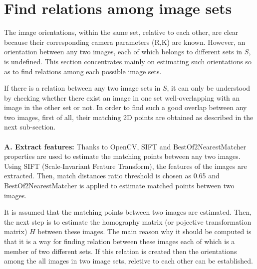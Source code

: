 \documentclass{article}
\begin{document}
\section*{Find relations among image sets}
The image orientations, within the same set, relative to each other, are clear because their corresponding camera parameters (R,K) are known. However, an orientation between any two images, each of which belongs to different sets in $S$, is undefined. This section concentrates mainly on estimating such orientations so as to find relations among each possible image sets.

If there is a relation between any two image sets in $S$, it can only be understood by checking whether there exist an image in one set well-overlapping with an image in the other set or not.  In order to find such a good overlap between any two images, first of all, their matching 2D points are obtained as described in the next sub-section.\\~\\
\textbf{A. Extract features:}
Thanks to OpenCV, SIFT and BestOf2NearestMatcher properties are used to estimate the matching points between any two images. Using SIFT (Scale-Invariant Feature Transform), the features of the images are extracted. Then, match distances ratio threshold is chosen as 0.65 and BestOf2NearestMatcher is applied to estimate matched points between two images. 

It is assumed that the matching points between two images are estimated. Then, the next step is to estimate the homography matrix (or pojective transformation matrix) $H$  between these images. The main reason why it should be computed is that it is a way for finding relation between these images  each of which is a member of two different sets. If this relation is created then the orientations among the all images in two image sets, reletive to each other can be established.
\end{document}
